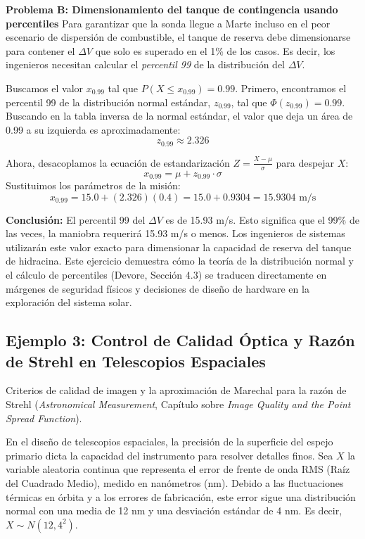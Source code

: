 \textbf{Problema B: Dimensionamiento del tanque de contingencia usando percentiles}
Para garantizar que la sonda llegue a Marte incluso en el peor escenario de dispersión de combustible, el tanque de reserva debe dimensionarse para contener el $\Delta V$ que solo es superado en el 1\% de los casos. Es decir, los ingenieros necesitan calcular el \textit{percentil 99} de la distribución del $\Delta V$.

Buscamos el valor $x_{0.99}$ tal que $P(X \le x_{0.99}) = 0.99$.
Primero, encontramos el percentil 99 de la distribución normal estándar, $z_{0.99}$, tal que $\Phi(z_{0.99}) = 0.99$. Buscando en la tabla inversa de la normal estándar, el valor que deja un área de 0.99 a su izquierda es aproximadamente:
$$ z_{0.99} \approx 2.326 $$

Ahora, desacoplamos la ecuación de estandarización $Z = \frac{X - \mu}{\sigma}$ para despejar $X$:
$$ x_{0.99} = \mu + z_{0.99} \cdot \sigma $$
Sustituimos los parámetros de la misión:
$$ x_{0.99} = 15.0 + (2.326)(0.4) = 15.0 + 0.9304 = 15.9304 \text{ m/s} $$

\textbf{Conclusión:}
El percentil 99 del $\Delta V$ es de 15.93 m/s. Esto significa que el 99\% de las veces, la maniobra requerirá 15.93 m/s o menos. Los ingenieros de sistemas utilizarán este valor exacto para dimensionar la capacidad de reserva del tanque de hidracina. Este ejercicio demuestra cómo la teoría de la distribución normal y el cálculo de percentiles (Devore, Sección 4.3) se traducen directamente en márgenes de seguridad físicos y decisiones de diseño de hardware en la exploración del sistema solar.


\subsection{Ejemplo 3: Control de Calidad Óptica y Razón de Strehl en Telescopios Espaciales}

Criterios de calidad de imagen y la aproximación de Marechal para la razón de Strehl (\textit{Astronomical Measurement}, Capítulo sobre \textit{Image Quality and the Point Spread Function}). 

En el diseño de telescopios espaciales, la precisión de la superficie del espejo primario dicta la capacidad del instrumento para resolver detalles finos. Sea $X$ la variable aleatoria continua que representa el error de frente de onda RMS (Raíz del Cuadrado Medio), medido en nanómetros (nm). Debido a las fluctuaciones térmicas en órbita y a los errores de fabricación, este error sigue una distribución normal con una media de 12 nm y una desviación estándar de 4 nm. Es decir, $X \sim N(12, 4^2)$.


